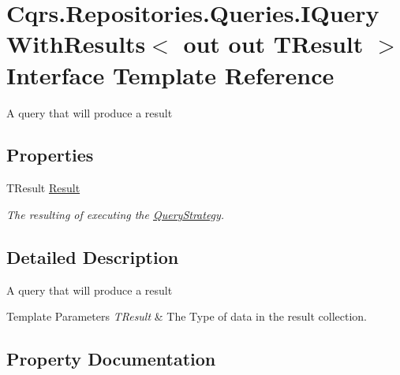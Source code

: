 \hypertarget{interfaceCqrs_1_1Repositories_1_1Queries_1_1IQueryWithResults}{}\section{Cqrs.\+Repositories.\+Queries.\+I\+Query\+With\+Results$<$ out out T\+Result $>$ Interface Template Reference}
\label{interfaceCqrs_1_1Repositories_1_1Queries_1_1IQueryWithResults}


A query that will produce a result  


\subsection*{Properties}
\begin{DoxyCompactItemize}
\item 
T\+Result \hyperlink{interfaceCqrs_1_1Repositories_1_1Queries_1_1IQueryWithResults_a54dc0f77254920505e4bc9793bb32b1a_a54dc0f77254920505e4bc9793bb32b1a}{Result}
\begin{DoxyCompactList}\small\item\em The resulting of executing the \hyperlink{classCqrs_1_1Repositories_1_1Queries_1_1QueryStrategy}{Query\+Strategy}. \end{DoxyCompactList}\end{DoxyCompactItemize}


\subsection{Detailed Description}
A query that will produce a result 


\begin{DoxyTemplParams}{Template Parameters}
{\em T\+Result} & The Type of data in the result collection.\\
\hline
\end{DoxyTemplParams}


\subsection{Property Documentation}
\mbox{\label{interfaceCqrs_1_1Repositories_1_1Queries_1_1IQueryWithResults_a54dc0f77254920505e4bc9793bb32b1a_a54dc0f77254920505e4bc9793bb32b1a}} 
